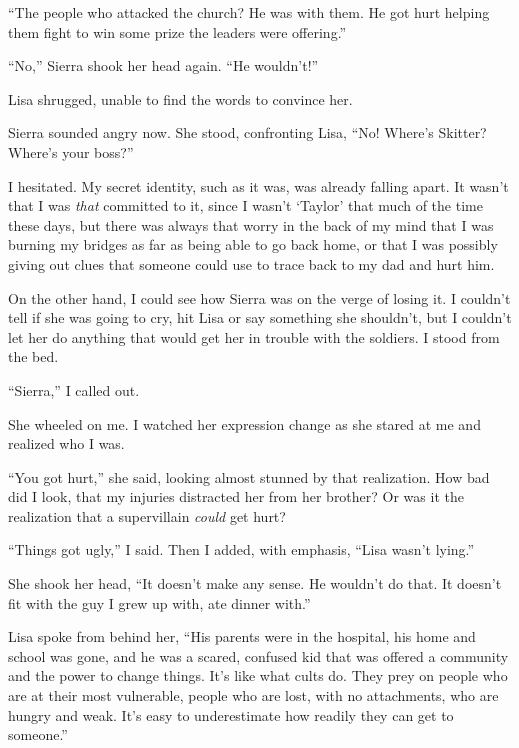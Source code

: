 ``The people who attacked the church?  He was with them.  He got hurt helping them fight to win some prize the leaders were offering.''



``No,'' Sierra shook her head again.  ``He wouldn't!''



Lisa shrugged, unable to find the words to convince her.



Sierra sounded angry now.  She stood, confronting Lisa, ``No!  Where's Skitter?  Where's your boss?''



I hesitated.  My secret identity, such as it was, was already falling apart.  It wasn't that I was \emph{that} committed to it, since I wasn't `Taylor' that much of the time these days, but there was always that worry in the back of my mind that I was burning my bridges as far as being able to go back home, or that I was possibly giving out clues that someone could use to trace back to my dad and hurt him.



On the other hand, I could see how Sierra was on the verge of losing it.  I couldn't tell if she was going to cry, hit Lisa or say something she shouldn't, but I couldn't let her do anything that would get her in trouble with the soldiers.  I stood from the bed.



``Sierra,'' I called out.



She wheeled on me.  I watched her expression change as she stared at me and realized who I was.



``You got hurt,'' she said, looking almost stunned by that realization.  How bad did I look, that my injuries distracted her from her brother?  Or was it the realization that a supervillain \emph{could} get hurt?



``Things got ugly,'' I said.  Then I added, with emphasis, ``Lisa wasn't lying.''



She shook her head, ``It doesn't make any sense.  He wouldn't do that.  It doesn't fit with the guy I grew up with, ate dinner with.''



Lisa spoke from behind her, ``His parents were in the hospital, his home and school was gone, and he was a scared, confused kid that was offered a community and the power to change things.  It's like what cults do.  They prey on people who are at their most vulnerable, people who are lost, with no attachments, who are hungry and weak.  It's easy to underestimate how readily they can get to someone.''



